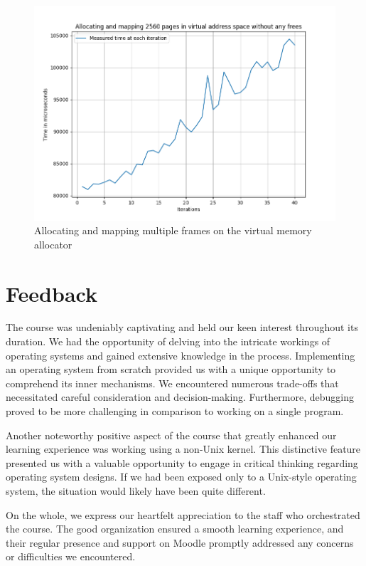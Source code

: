 \begin{figure}[htp]
    \centering
    \includegraphics[width=12cm]{images/benchmarks/better.png}
    \caption{Allocating and mapping multiple frames on the virtual memory allocator}
    \label{fig:galaxy}
\end{figure}

\endgroup

\begingroup
\renewcommand\thechapter{C}
\chapter{Feedback}
{\normalfont\huge\bfseries}{}{}{\Huge}

The course was undeniably captivating and held our keen interest throughout its duration. We had the opportunity of delving into the intricate workings of operating systems and gained extensive knowledge in the process. Implementing an operating system from scratch provided us with a unique opportunity to comprehend its inner mechanisms. We encountered numerous trade-offs that necessitated careful consideration and decision-making. Furthermore, debugging proved to be more challenging in comparison to working on a single program.

\medskip

Another noteworthy positive aspect of the course that greatly enhanced our learning experience was working using a non-Unix kernel. This distinctive feature presented us with a valuable opportunity to engage in critical thinking regarding operating system designs. If we had been exposed only to a Unix-style operating system, the situation would likely have been quite different.
 
\medskip

On the whole, we express our heartfelt appreciation to the staff who orchestrated the course. The good organization ensured a smooth learning experience, and their regular presence and support on Moodle promptly addressed any concerns or difficulties we encountered.

